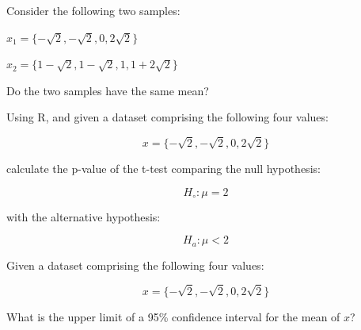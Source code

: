 \documentclass{article}
\begin{document}
\vspace{1cm}

\begin{minipage}{16cm}
Consider the following two samples:\medskip

$x_1 = \{-\sqrt{2},-\sqrt{2},0,2\sqrt{2}\}$\medskip

$x_2 = \{1-\sqrt{2},1-\sqrt{2},1,1+2\sqrt{2}\}$\medskip

Do the two samples have the same mean?
\end{minipage}

\vspace{1cm}

\begin{minipage}{15cm}
Using R, and given a dataset comprising the following four values:

\[x=\{-\sqrt{2},-\sqrt{2},0,2\sqrt{2}\}\]

calculate the p-value of the t-test comparing the null hypothesis:

\[H_\circ: \mu = 2\]

with the alternative hypothesis:

\[ H_a: \mu < 2 \]
\end{minipage}

\vspace{1cm}

\begin{minipage}{15cm}
Given a dataset comprising the following four values:

\[
x=\{-\sqrt{2},-\sqrt{2},0,2\sqrt{2}\}
\]

What is the upper limit of a 95\% confidence interval for the mean of $x$?

\end{minipage}

\vspace{1cm}
\end{document}
